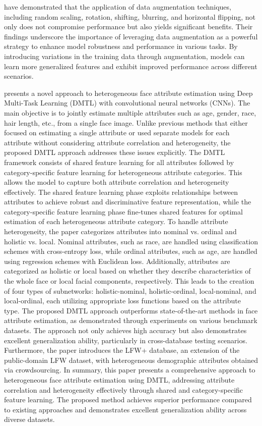 \documentclass{article}
\begin{document}
\citet{DBLP:journals/corr/GuntherRB16} have demonstrated that the application of data augmentation techniques, including random scaling, rotation, shifting, blurring, and horizontal flipping, not only does not compromise performance but also yields significant benefits.
Their findings underscore the importance of leveraging data augmentation as a powerful strategy to enhance model robustness and performance in various tasks.
By introducing variations in the training data through augmentation, models can learn more generalized features and exhibit improved performance across different scenarios.

\citet{DBLP:journals/corr/HanJSC17} presents a novel approach to heterogeneous face attribute estimation using Deep Multi-Task Learning (DMTL) with convolutional neural networks (CNNs).
The main objective is to jointly estimate multiple attributes such as age, gender, race, hair length, etc., from a single face image.
Unlike previous methods that either focused on estimating a single attribute or used separate models for each attribute without considering attribute correlation and heterogeneity, the proposed DMTL approach addresses these issues explicitly.
The DMTL framework consists of shared feature learning for all attributes followed by category-specific feature learning for heterogeneous attribute categories.
This allows the model to capture both attribute correlation and heterogeneity effectively.
The shared feature learning phase exploits relationships between attributes to achieve robust and discriminative feature representation, while the category-specific feature learning phase fine-tunes shared features for optimal estimation of each heterogeneous attribute category.
To handle attribute heterogeneity, the paper categorizes attributes into nominal vs. ordinal and holistic vs. local.
Nominal attributes, such as race, are handled using classification schemes with cross-entropy loss, while ordinal attributes, such as age, are handled using regression schemes with Euclidean loss.
Additionally, attributes are categorized as holistic or local based on whether they describe characteristics of the whole face or local facial components, respectively.
This leads to the creation of four types of subnetworks: holistic-nominal, holistic-ordinal, local-nominal, and local-ordinal, each utilizing appropriate loss functions based on the attribute type.
The proposed DMTL approach outperforms state-of-the-art methods in face attribute estimation, as demonstrated through experiments on various benchmark datasets.
The approach not only achieves high accuracy but also demonstrates excellent generalization ability, particularly in cross-database testing scenarios.
Furthermore, the paper introduces the LFW+ database, an extension of the public-domain LFW dataset, with heterogeneous demographic attributes obtained via crowdsourcing.
In summary, this paper presents a comprehensive approach to heterogeneous face attribute estimation using DMTL, addressing attribute correlation and heterogeneity effectively through shared and category-specific feature learning.
The proposed method achieves superior performance compared to existing approaches and demonstrates excellent generalization ability across diverse datasets.
\end{document}

